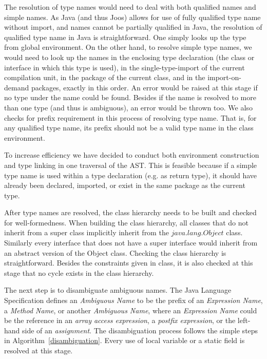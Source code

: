 \documentclass[a4paper, notitlepage]{report}
\begin{document}
The resolution of type names would need to deal with both qualified names and simple names. As Java (and thus Joos) allows for use of fully qualified type name without import, and names cannot be partially qualified in Java, the resolution of qualified type name in Java is straightforward. One simply looks up the type from global environment. On the other hand, to resolve simple type names, we would need to look up the names in the enclosing type declaration (the class or interface in which this type is used), in the single-type-import of the current compilation unit, in the package of the current class, and in the import-on-demand packages, exactly in this order. An error would be raised at this stage if no type under the name could be found. Besides if the name is resolved to more than one type (and thus is ambiguous), an error would be thrown too. We also checks for prefix requirement in this process of resolving type name. That is, for any qualified type name, its prefix should not be a valid type name in the class environment.

To increase efficiency we have decided to conduct both environment construction and type linking in one traversal of the AST. This is feasible because if a simple type name is used within a type declaration (e.g. as return type), it should have already been declared, imported, or exist in the same package as the current type. 

After type names are resolved, the class hierarchy needs to be built and checked for well-formedness. When building the class hierarchy, all classes that do not inherit from a super class implicitly inherit from the $java.lang.Object$ class. Similarly every interface that does not have a super interface would inherit from an abstract version of the Object class. Checking the class hierarchy is straightforward. Besides the constraints given in class, it is also checked at this stage that no cycle exists in the class hierarchy.

The next step is to disambiguate ambiguous names. The Java Language Specification defines an \emph{Ambiguous Name} to be the prefix of an \emph{Expression Name}, a \emph{Method Name}, or another \emph{Ambiguous Name}, where an \emph{Expression Name} could be the reference in an \emph{array access expression}, a \emph{postfix expression}, or the left-hand side of an \emph{assignment}. The disambiguation process follows the simple steps in Algorithm~\ref{disambiguation}. Every use of local variable or a static field is resolved at this stage.
\end{document}
